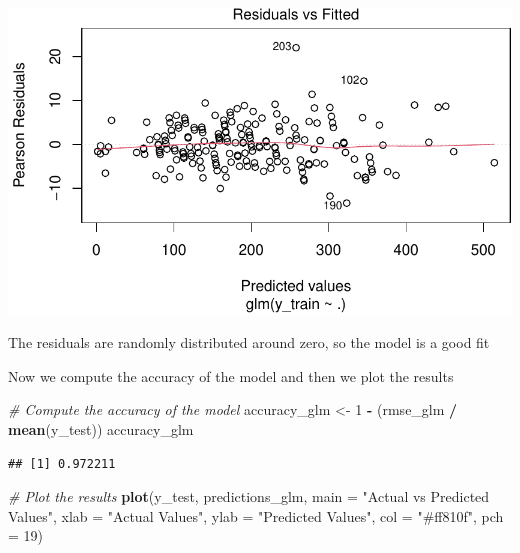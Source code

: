 \documentclass[
]{article}
\newenvironment{Shaded}{\begin{snugshade}}{\end{snugshade}}
\newcommand{\AttributeTok}[1]{\textcolor[rgb]{0.13,0.29,0.53}{#1}}
\newcommand{\CommentTok}[1]{\textcolor[rgb]{0.56,0.35,0.01}{\textit{#1}}}
\newcommand{\DecValTok}[1]{\textcolor[rgb]{0.00,0.00,0.81}{#1}}
\newcommand{\FunctionTok}[1]{\textcolor[rgb]{0.13,0.29,0.53}{\textbf{#1}}}
\newcommand{\NormalTok}[1]{#1}
\newcommand{\OtherTok}[1]{\textcolor[rgb]{0.56,0.35,0.01}{#1}}
\newcommand{\SpecialCharTok}[1]{\textcolor[rgb]{0.81,0.36,0.00}{\textbf{#1}}}
\newcommand{\StringTok}[1]{\textcolor[rgb]{0.31,0.60,0.02}{#1}}
\begin{document}
\begin{center}\includegraphics{Statistical_Learning_Final_Report_files/figure-latex/model_evaluation_glm-1} \end{center}

The residuals are randomly distributed around zero, so the model is a
good fit

Now we compute the accuracy of the model and then we plot the results

\begin{Shaded}
\begin{Highlighting}[]
\CommentTok{\# Compute the accuracy of the model}
\NormalTok{accuracy\_glm }\OtherTok{\textless{}{-}} \DecValTok{1} \SpecialCharTok{{-}}\NormalTok{ (rmse\_glm }\SpecialCharTok{/} \FunctionTok{mean}\NormalTok{(y\_test))}
\NormalTok{accuracy\_glm}
\end{Highlighting}
\end{Shaded}

\begin{verbatim}
## [1] 0.972211
\end{verbatim}

\begin{Shaded}
\begin{Highlighting}[]
\CommentTok{\# Plot the results}
\FunctionTok{plot}\NormalTok{(y\_test, predictions\_glm, }\AttributeTok{main =} \StringTok{"Actual vs Predicted Values"}\NormalTok{,}
     \AttributeTok{xlab =} \StringTok{"Actual Values"}\NormalTok{, }\AttributeTok{ylab =} \StringTok{"Predicted Values"}\NormalTok{,}
     \AttributeTok{col =} \StringTok{"\#ff810f"}\NormalTok{, }\AttributeTok{pch =} \DecValTok{19}\NormalTok{)}
\end{Highlighting}
\end{Shaded}
\end{document}
